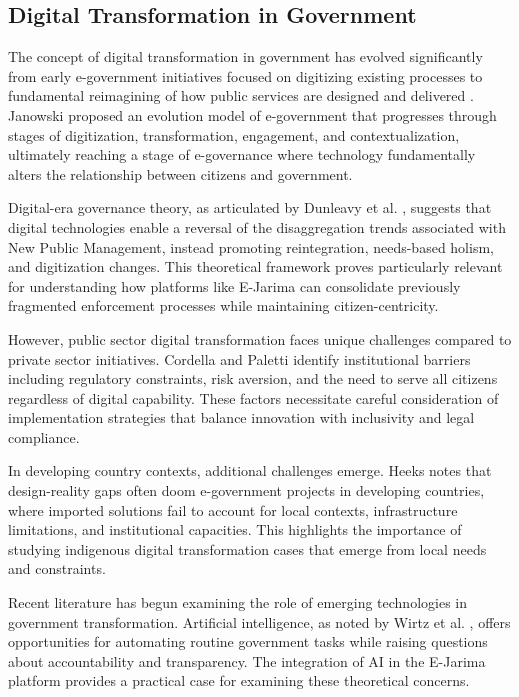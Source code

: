 \documentclass[pdflatex,sn-mathphys-num]{sn-jnl}%
\theoremstyle{thmstyleone}%
\theoremstyle{thmstyletwo}%
\theoremstyle{thmstylethree}%
\begin{document}
\subsection{Digital Transformation in Government}\label{subsec4}

The concept of digital transformation in government has evolved significantly from early e-government initiatives focused on digitizing existing processes to fundamental reimagining of how public services are designed and delivered \cite{fountain2001building,dunleavy2011innovation}. Janowski \cite{janowski2015digital} proposed an evolution model of e-government that progresses through stages of digitization, transformation, engagement, and contextualization, ultimately reaching a stage of e-governance where technology fundamentally alters the relationship between citizens and government.

Digital-era governance theory, as articulated by Dunleavy et al. \cite{dunleavy2006new}, suggests that digital technologies enable a reversal of the disaggregation trends associated with New Public Management, instead promoting reintegration, needs-based holism, and digitization changes. This theoretical framework proves particularly relevant for understanding how platforms like E-Jarima can consolidate previously fragmented enforcement processes while maintaining citizen-centricity.

However, public sector digital transformation faces unique challenges compared to private sector initiatives. Cordella and Paletti \cite{cordella2019digital} identify institutional barriers including regulatory constraints, risk aversion, and the need to serve all citizens regardless of digital capability. These factors necessitate careful consideration of implementation strategies that balance innovation with inclusivity and legal compliance.

In developing country contexts, additional challenges emerge. Heeks \cite{heeks2018ict4d} notes that design-reality gaps often doom e-government projects in developing countries, where imported solutions fail to account for local contexts, infrastructure limitations, and institutional capacities. This highlights the importance of studying indigenous digital transformation cases that emerge from local needs and constraints.

Recent literature has begun examining the role of emerging technologies in government transformation. Artificial intelligence, as noted by Wirtz et al. \cite{wirtz2019artificial}, offers opportunities for automating routine government tasks while raising questions about accountability and transparency. The integration of AI in the E-Jarima platform provides a practical case for examining these theoretical concerns.
\end{document}

